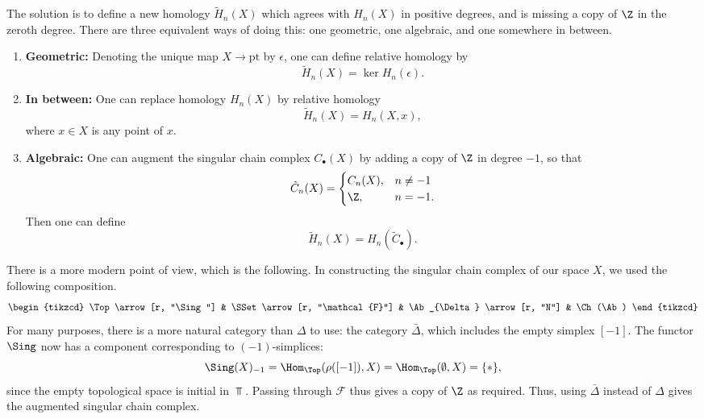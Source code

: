 \documentclass[main.tex]{subfiles}
\begin{document}
The solution is to define a new homology $\tilde{H}_{n}(X)$ which agrees with $H_{n}(X)$ in positive degrees, and is missing a copy of $\Z$ in the zeroth degree. There are three equivalent ways of doing this: one geometric, one algebraic, and one somewhere in between.
\begin{enumerate}
  \item \textbf{Geometric:} Denoting the unique map $X \to \mathrm{pt}$ by $\epsilon$, one can define relative homology by
    \begin{equation*}
      \tilde{H}_{n}(X) = \ker H_{n}(\epsilon).
    \end{equation*}

  \item \textbf{In between:} One can replace homology $H_{n}(X)$ by relative homology
    \begin{equation*}
      \tilde{H}_{n}(X) = H_{n}(X, x),
    \end{equation*}
    where $x \in X$ is any point of $x$.

  \item \textbf{Algebraic:} One can augment the singular chain complex $C_{\bullet}(X)$ by adding a copy of $\Z$ in degree $-1$, so that
    \begin{equation*}
      \tilde{C}_{n}(X) =
      \begin{cases}
        C_{n}(X), &n \neq -1 \\
        \Z, &n = -1.
      \end{cases}
    \end{equation*}
    Then one can define
    \begin{equation*}
      \tilde{H}_{n}(X) = H_{n}(\tilde{C}_{\bullet}).
    \end{equation*}
\end{enumerate}

There is a more modern point of view, which is the following. In constructing the singular chain complex of our space $X$, we used the following composition.
\begin{equation*}
  \begin{tikzcd}
    \Top
    \arrow[r, "\Sing"]
    & \SSet
    \arrow[r, "\mathcal{F}"]
    & \Ab_{\Delta}
    \arrow[r, "N"]
    & \Ch(\Ab)
  \end{tikzcd}
\end{equation*}
For many purposes, there is a more natural category than $\Delta$ to use: the category $\bar{\Delta}$, which includes the empty simplex $[-1]$. The functor $\Sing$ now has a component corresponding to $(-1)$-simplices:
\begin{equation*}
  \Sing(X)_{-1} = \Hom_{\Top}(\rho([-1]), X) = \Hom_{\Top}(\emptyset, X) = \{*\},
\end{equation*}
since the empty topological space is initial in $\Top$. Passing through $\mathcal{F}$ thus gives a copy of $\Z$ as required. Thus, using $\bar{\Delta}$ instead of $\Delta$ gives the augmented singular chain complex.
\end{document}
